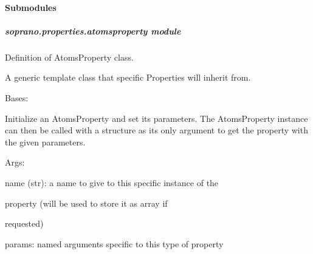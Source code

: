 \documentclass[letterpaper,10pt,english]{sphinxmanual}
\begin{document}
\paragraph{Submodules}
\label{doctree/soprano.properties:submodules}

\subparagraph{soprano.properties.atomsproperty module}
\label{doctree/soprano.properties.atomsproperty:module-soprano.properties.atomsproperty}\label{doctree/soprano.properties.atomsproperty:soprano-properties-atomsproperty-module}\label{doctree/soprano.properties.atomsproperty::doc}
Definition of AtomsProperty class.

A generic template class that specific Properties will inherit from.

\begin{fulllineitems}
\label{doctree/soprano.properties.atomsproperty:soprano.properties.atomsproperty.AtomsProperty}
Bases: 

Initialize an AtomsProperty and set its parameters.
The AtomsProperty instance can then be called with a structure as its
only argument to get the property with the given parameters.

\begin{DUlineblock}{0em}
\item[] Args:
\item[]
\begin{DUlineblock}{\DUlineblockindent}
\item[] name (str): a name to give to this specific instance of the
\item[]
\begin{DUlineblock}{\DUlineblockindent}
\item[] property (will be used to store it as array if
\item[] requested)
\end{DUlineblock}
\item[] params: named arguments specific to this type of property
\end{DUlineblock}
\end{DUlineblock}

\begin{fulllineitems}
\label{doctree/soprano.properties.atomsproperty:soprano.properties.atomsproperty.AtomsProperty.default_name}
\end{fulllineitems}


\end{fulllineitems}
\end{document}

